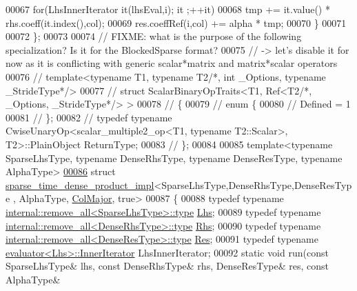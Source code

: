 \begin{DoxyCode}
00067     \textcolor{keywordflow}{for}(LhsInnerIterator it(lhsEval,i); it ;++it)
00068       tmp += it.value() * rhs.coeff(it.index(),col);
00069     res.coeffRef(i,col) += alpha * tmp;
00070   \}
00071   
00072 \};
00073 
00074 \textcolor{comment}{// FIXME: what is the purpose of the following specialization? Is it for the BlockedSparse format?}
00075 \textcolor{comment}{// -> let's disable it for now as it is conflicting with generic scalar*matrix and matrix*scalar operators}
00076 \textcolor{comment}{// template<typename T1, typename T2/*, int \_Options, typename \_StrideType*/>}
00077 \textcolor{comment}{// struct ScalarBinaryOpTraits<T1, Ref<T2/*, \_Options, \_StrideType*/> >}
00078 \textcolor{comment}{// \{}
00079 \textcolor{comment}{//   enum \{}
00080 \textcolor{comment}{//     Defined = 1}
00081 \textcolor{comment}{//   \};}
00082 \textcolor{comment}{//   typedef typename CwiseUnaryOp<scalar\_multiple2\_op<T1, typename T2::Scalar>, T2>::PlainObject
       ReturnType;}
00083 \textcolor{comment}{// \};}
00084 
00085 \textcolor{keyword}{template}<\textcolor{keyword}{typename} SparseLhsType, \textcolor{keyword}{typename} DenseRhsType, \textcolor{keyword}{typename} DenseResType, \textcolor{keyword}{typename} AlphaType>
\hyperlink{struct_eigen_1_1internal_1_1sparse__time__dense__product__impl_3_01_sparse_lhs_type_00_01_dense_4902bcccfe44923f57955b34ebedf211}{00086} \textcolor{keyword}{struct }\hyperlink{struct_eigen_1_1internal_1_1sparse__time__dense__product__impl}{sparse\_time\_dense\_product\_impl}<SparseLhsType,DenseRhsType,DenseResType
      , AlphaType, \hyperlink{group__enums_ggaacded1a18ae58b0f554751f6cdf9eb13a0cbd4bdd0abcfc0224c5fcb5e4f6669a}{ColMajor}, true>
00087 \{
00088   \textcolor{keyword}{typedef} \textcolor{keyword}{typename} \hyperlink{group___sparse_core___module}{internal::remove\_all<SparseLhsType>::type} 
      \hyperlink{group___sparse_core___module}{Lhs};
00089   \textcolor{keyword}{typedef} \textcolor{keyword}{typename} \hyperlink{group___sparse_core___module}{internal::remove\_all<DenseRhsType>::type} 
      \hyperlink{group___sparse_core___module}{Rhs};
00090   \textcolor{keyword}{typedef} \textcolor{keyword}{typename} \hyperlink{group___sparse_core___module}{internal::remove\_all<DenseResType>::type} 
      \hyperlink{group___sparse_core___module}{Res};
00091   \textcolor{keyword}{typedef} \textcolor{keyword}{typename} \hyperlink{struct_eigen_1_1internal_1_1evaluator}{evaluator<Lhs>::InnerIterator} LhsInnerIterator;
00092   \textcolor{keyword}{static} \textcolor{keywordtype}{void} run(\textcolor{keyword}{const} SparseLhsType& lhs, \textcolor{keyword}{const} DenseRhsType& rhs, DenseResType& res, \textcolor{keyword}{const} AlphaType& 

\end{DoxyCode}
